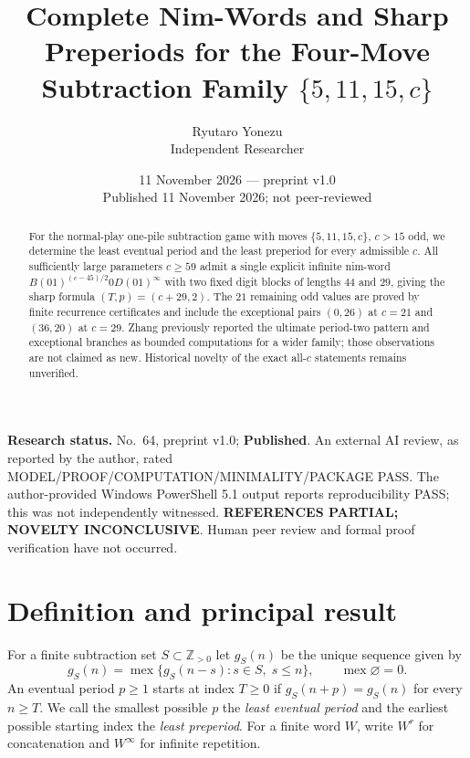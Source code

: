 \documentclass[10pt,a4paper]{article}
\title{Complete Nim-Words and Sharp Preperiods for the Four-Move Subtraction Family $\{5,11,15,c\}$}
\author{Ryutaro Yonezu\\\small Independent Researcher}
\date{11 November 2026 --- preprint v1.0\\\small Published 11 November 2026; not peer-reviewed}
\newcommand{\mex}{\operatorname{mex}}
\begin{document}
\maketitle
\begin{abstract}
For the normal-play one-pile subtraction game with moves $\{5,11,15,c\}$, $c>15$ odd, we determine the least eventual period and the least preperiod for every admissible $c$. All sufficiently large parameters $c\ge59$ admit a single explicit infinite nim-word $B(01)^{(c-45)/2}0D(01)^\infty$ with two fixed digit blocks of lengths $44$ and $29$, giving the sharp formula $(T,p)=(c+29,2)$. The $21$ remaining odd values are proved by finite recurrence certificates and include the exceptional pairs $(0,26)$ at $c=21$ and $(36,20)$ at $c=29$. Zhang previously reported the ultimate period-two pattern and exceptional branches as bounded computations for a wider family; those observations are not claimed as new. Historical novelty of the exact all-$c$ statements remains unverified.
\end{abstract}
\noindent\textbf{Research status.} No.~64, preprint v1.0; \textbf{Published}. An external AI review, as reported by the author, rated MODEL/PROOF/COMPUTATION/MINIMALITY/PACKAGE PASS. The author-provided Windows PowerShell 5.1 output reports reproducibility PASS; this was not independently witnessed. \textbf{REFERENCES PARTIAL; NOVELTY INCONCLUSIVE}. Human peer review and formal proof verification have not occurred.

\section{Definition and principal result}
For a finite subtraction set $S\subset\mathbb{Z}_{>0}$ let $g_S(n)$ be the unique sequence given by
\begin{equation}\label{rec}
 g_S(n)=\mex\{g_S(n-s):s\in S,\;s\le n\},\qquad \mex\varnothing=0.
\end{equation}
An eventual period $p\ge1$ starts at index $T\ge0$ if $g_S(n+p)=g_S(n)$ for every $n\ge T$. We call the smallest possible $p$ the \emph{least eventual period} and the earliest possible starting index the \emph{least preperiod}. For a finite word $W$, write $W^r$ for concatenation and $W^\infty$ for infinite repetition.
\end{document}
